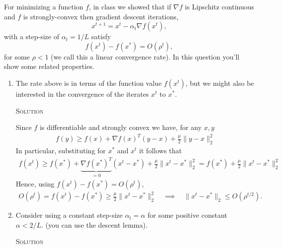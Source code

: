 \documentclass{article}
\begin{document}
For minimizing a function $f$, in class we showed that if $\nabla f$ is Lipschitz continuous and $f$ is strongly-convex then gradient descent iterations,
\[
x^{t+1} = x^t - \alpha_t\nabla f(x^t),
\] 
with a step-size of $\alpha_t = 1/L$ satisfy
\[
f(x^t) - f(x^*) = O(\rho^t),
\]
for some $\rho < 1$ (we call this a linear convergence rate).
In this question you'll show some related properties.
\begin{enumerate}
\item The rate above is in terms of the function value $f(x^t)$, but we
  might also be interested in the convergence of the iterates $x^t$ to
  $x^*$. 

  \textsc{Solution}

  Since $f$ is differentiable and strongly convex we have, for any $x, y$
  \begin{align*}
    f(y) \geq f(x) + \nabla f(x)^T(y-x) + \frac{\mu}{2} \|y-x\|_2^2
  \end{align*}
  In particular, substituting for $x^*$ and $x^t$ it follows that
  \begin{align*}
    f(x^t) %
    \geq f(x^*) %
    + \underbrace{\nabla f(x^*)^T}_{=0} (x^t - x^*) %
    + \frac{\mu}{2} \|x^t - x^*\|_2^2 %
    = f(x^*) + \frac{\mu}{2} \|x^t - x^*\|_2^2
  \end{align*}
  Hence, using $f(x^t) - f(x^*) = O(\rho^t)$,
  \begin{align*}
    O(\rho^t) = f(x^t) - f(x^*) \geq \frac{\mu}{2} \|x^t - x^*\|_2^2  %
    \quad \implies \quad %
    \|x^t - x^*\|_2 \leq O(\rho^{t/2}).
  \end{align*}

  
\item Consider using a constant step-size $\alpha_t = \alpha$ for some positive
  constant $\alpha < 2/L$.  (you can use the descent lemma).

  \textsc{Solution}


\end{enumerate}
\end{document}
